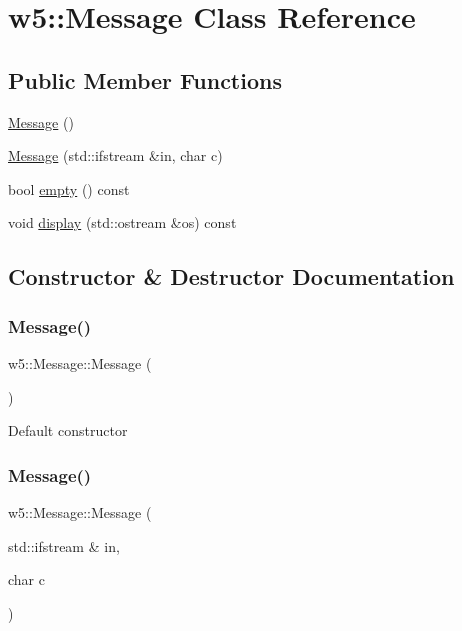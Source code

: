 \hypertarget{classw5_1_1_message}{}\section{w5\+:\+:Message Class Reference}
\label{classw5_1_1_message}
\subsection*{Public Member Functions}
\begin{DoxyCompactItemize}
\item 
\mbox{\hyperlink{classw5_1_1_message_aacab4dd9d90b0d5942e8ac0e6e0a722a}{Message}} ()
\item 
\mbox{\hyperlink{classw5_1_1_message_a669c79f1d7a90ee0a0f09516711481d4}{Message}} (std\+::ifstream \&in, char c)
\item 
bool \mbox{\hyperlink{classw5_1_1_message_aeeb54ee5ef1fd404dfbf0c7ff3f1cbf7}{empty}} () const
\item 
void \mbox{\hyperlink{classw5_1_1_message_a62557fb75ec980a11f6dd3910f52143a}{display}} (std\+::ostream \&os) const
\end{DoxyCompactItemize}


\subsection{Constructor \& Destructor Documentation}
\mbox{\label{classw5_1_1_message_aacab4dd9d90b0d5942e8ac0e6e0a722a}} 
\subsubsection{\texorpdfstring{Message()}{Message()}\hspace{0.1cm}{\footnotesize\ttfamily [1/2]}}
{\footnotesize\ttfamily w5\+::\+Message\+::\+Message (\begin{DoxyParamCaption}{ }\end{DoxyParamCaption})}

Default constructor \mbox{\label{classw5_1_1_message_a669c79f1d7a90ee0a0f09516711481d4}} 
\subsubsection{\texorpdfstring{Message()}{Message()}\hspace{0.1cm}{\footnotesize\ttfamily [2/2]}}
{\footnotesize\ttfamily w5\+::\+Message\+::\+Message (\begin{DoxyParamCaption}\item[{std\+::ifstream \&}]{in,  }\item[{char}]{c }\end{DoxyParamCaption})}


